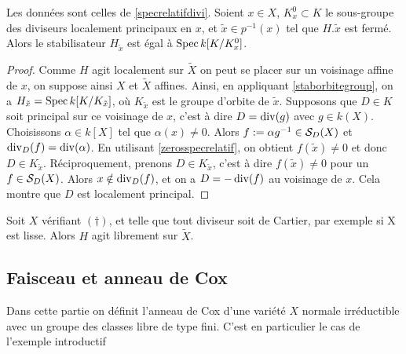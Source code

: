 \begin{cor}
Les données sont celles de \ref{specrelatifdivi}. Soient $x\in X$, $K_x^0\subset K$ le sous-groupe des diviseurs localement principaux en $x$, et $\tilde{x}\in p^{-1}(x)$ tel que $H.\tilde{x}$ est fermé. Alors le stabilisateur $H_{\tilde{x}}$ est égal à $\operatorname{Spec} k[K/K_x^0]$.
\end{cor}
\begin{proof}
Comme $H$ agit localement sur $\widetilde{X}$ on peut se placer sur un voisinage affine de $x$, on suppose ainsi $X$ et $\widetilde{X}$ affines. Ainsi, en appliquant \ref{staborbitegroup}, on a $H_{\tilde{x}}=\operatorname{Spec} k[K/K_{\tilde{x}}]$, où $K_{\tilde{x}}$ est le groupe d'orbite de $\tilde{x}$. Supposons que $D\in K$ soit principal sur ce voisinage de $x$, c'est à dire $D=\operatorname{div}(g)$ avec $g\in k(X)$. Choisissons $\alpha \in k[X]$ tel que $\alpha(x)\neq 0$. Alors $f:=\alpha g^{-1}\in \mathcal{S}_D(X)$ et $\operatorname{div}_D(f)=\operatorname{div}(\alpha)$. En utilisant \ref{zerosspecrelatif}, on obtient $f(\tilde{x})\neq 0$ et donc $D\in K_{\tilde{x}}$. Réciproquement, prenons $D\in K_{\tilde{x}}$, c'est à dire $f(\tilde{x})\neq 0$ pour un $f\in \mathcal{S}_D(X)$. Alors $x\notin \operatorname{div}_D(f)$, et on a $D=-\operatorname{div}(f)$ au voisinage de $x$. Cela montre que $D$ est localement principal.
\end{proof}

\begin{cor}
Soit $X$ vérifiant $(\dagger)$, et telle que tout diviseur soit de Cartier, par exemple si X est lisse. Alors $H$ agit librement sur $\widetilde{X}$.
\end{cor}



\subsection{Faisceau et anneau de Cox}

Dans cette partie on définit l'anneau de Cox d'une variété $X$ normale irréductible avec un groupe des classes libre de type fini. C'est en particulier le cas de l'exemple introductif

